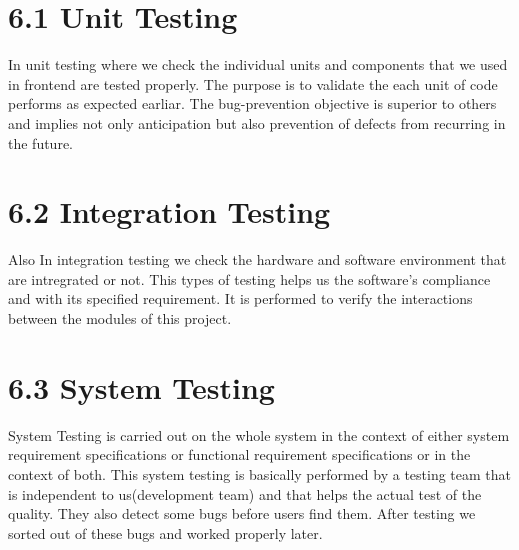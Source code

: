 \documentclass{standalone}
\begin{document}
\section*{6.1\hspace{0.3 cm} Unit Testing}
 \vspace{0.5cm}

\hspace{0.5cm} In unit testing where we check the individual units and components that we used in frontend are tested properly. The purpose is to validate the each unit of code performs as expected earliar. The bug-prevention objective is superior to others and implies not only anticipation but also prevention of defects from recurring in the future.\vspace{1cm}

\section*{6.2\hspace{0.3 cm} Integration Testing}
 \vspace{0.3cm}

\hspace{0.5cm} Also In integration testing we check the hardware and software environment that are intregrated or not. This types of testing helps us the software's compliance and with its specified requirement. It is performed to verify the interactions between the modules of this project.\vspace{1cm}

\section*{6.3\hspace{0.3 cm} System Testing}
 \vspace{0.3cm}

\hspace{0.5cm}System Testing is carried out on the whole system in the context of either system requirement specifications or functional requirement specifications or in the context of both. This system testing is basically performed by a testing team that is independent to us(development team) and that helps the actual test of the quality. They also detect some bugs before users find them. After testing we sorted out of these bugs and worked properly later.\vspace{0.7cm}
\end{document}
